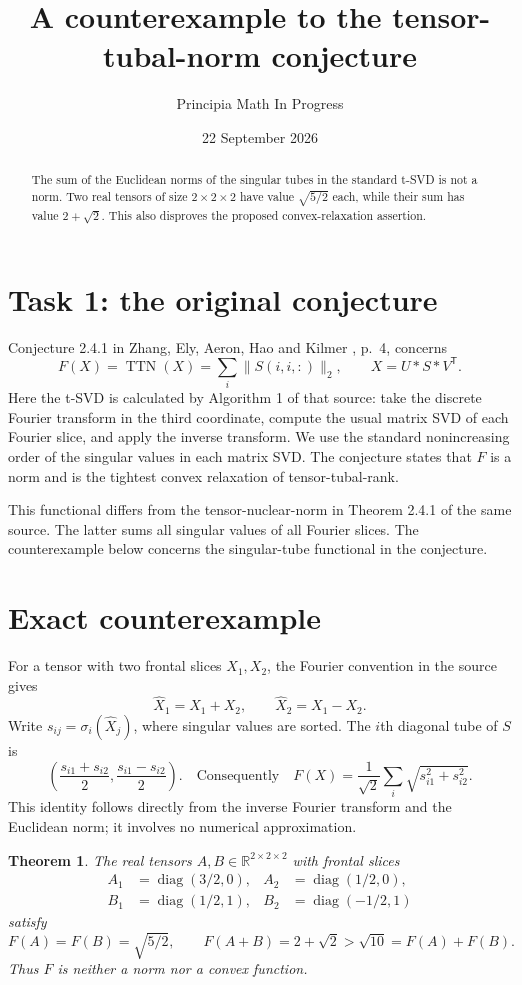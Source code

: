 \documentclass[11pt]{article}
\title{A counterexample to the tensor-tubal-norm conjecture}
\author{Principia Math In Progress}
\date{22 September 2026}
\newtheorem{theorem}{Theorem}
\newcommand{\TTN}{\operatorname{TTN}}
\newcommand{\diag}{\operatorname{diag}}
\begin{document}
\maketitle
\begin{abstract}
The sum of the Euclidean norms of the singular tubes in the standard
t-SVD is not a norm. Two real tensors of size $2\times2\times2$ have
value $\sqrt{5/2}$ each, while their sum has value $2+\sqrt2$.
This also disproves the proposed convex-relaxation assertion.
\end{abstract}

\section*{Task 1: the original conjecture}
Conjecture 2.4.1 in Zhang, Ely, Aeron, Hao and Kilmer
\cite{original}, p.~4, concerns
\[
 F(X)=\TTN(X)=\sum_i\|S(i,i,:)\|_2,
 \qquad X=U*S*V^{\mathsf T}.
\]
Here the t-SVD is calculated by Algorithm 1 of that source: take the
discrete Fourier transform in the third coordinate, compute the usual
matrix SVD of each Fourier slice, and apply the inverse transform.
We use the standard nonincreasing order of the singular values in each
matrix SVD. The conjecture states that $F$ is a norm and is the tightest
convex relaxation of tensor-tubal-rank.

This functional differs from the tensor-nuclear-norm in Theorem 2.4.1
of the same source. The latter sums all singular values of all Fourier
slices. The counterexample below concerns the singular-tube functional
in the conjecture.

\section*{Exact counterexample}
For a tensor with two frontal slices $X_1,X_2$, the Fourier convention
in the source gives
\[
 \widehat X_1=X_1+X_2,\qquad \widehat X_2=X_1-X_2.
\]
Write $s_{ij}=\sigma_i(\widehat X_j)$, where singular values are sorted.
The $i$th diagonal tube of $S$ is
\[
 \left(\frac{s_{i1}+s_{i2}}2,\frac{s_{i1}-s_{i2}}2\right).
 \quad\text{Consequently}\quad
 F(X)=\frac1{\sqrt2}\sum_i\sqrt{s_{i1}^2+s_{i2}^2}.
 \tag{1}
\]
This identity follows directly from the inverse Fourier transform and
the Euclidean norm; it involves no numerical approximation.

\begin{theorem}
The real tensors $A,B\in\mathbb R^{2\times2\times2}$ with frontal slices
\[
 \begin{aligned}
 A_1&=\diag(3/2,0),& A_2&=\diag(1/2,0),\\
 B_1&=\diag(1/2,1),& B_2&=\diag(-1/2,1)
 \end{aligned}
\]
satisfy
\[
 F(A)=F(B)=\sqrt{5/2},\qquad
 F(A+B)=2+\sqrt2>\sqrt{10}=F(A)+F(B).
\]
Thus $F$ is neither a norm nor a convex function.
\end{theorem}
\end{document}
